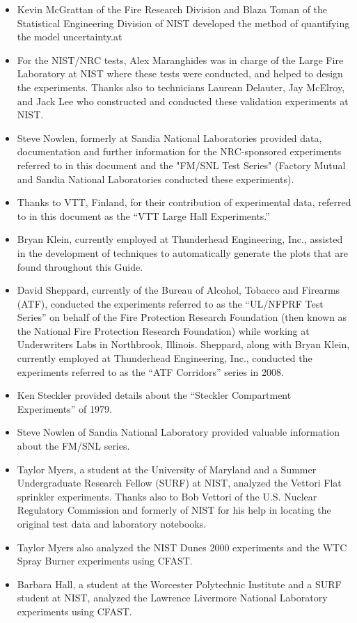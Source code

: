 \documentclass[12pt]{book}
\begin{document}
\begin{itemize}
\item Kevin McGrattan of the Fire Research Division and Blaza Toman of the Statistical Engineering Division of NIST developed the method of quantifying the model uncertainty.at
\item For the NIST/NRC tests, Alex Maranghides was in charge of the Large Fire Laboratory at NIST where these tests were conducted, and helped to design the experiments. Thanks also to technicians Laurean Delauter, Jay McElroy, and Jack Lee who constructed and conducted these validation experiments at NIST.

\item Steve Nowlen, formerly at Sandia National Laboratories provided data, documentation and further information for the NRC-sponsored experiments referred to in this document and the "FM/SNL Test Series" (Factory Mutual and Sandia National Laboratories conducted these experiments).

\item Thanks to VTT, Finland, for their contribution of experimental data, referred to in this document as the ``VTT Large Hall Experiments.''

\item Bryan Klein, currently employed at Thunderhead Engineering, Inc., assisted in the development of techniques to automatically generate the plots that are found throughout this Guide.

\item David Sheppard, currently of the Bureau of Alcohol, Tobacco and Firearms (ATF), conducted the experiments referred to as the ``UL/NFPRF Test Series'' on behalf of the Fire Protection Research Foundation (then known as the National Fire Protection Research Foundation) while working at Underwriters Labs in Northbrook, Illinois. Sheppard, along with Bryan Klein, currently employed at Thunderhead Engineering, Inc., conducted the experiments referred to as the ``ATF Corridors'' series in 2008.

\item Ken Steckler provided details about the ``Steckler Compartment Experiments'' of 1979.

\item Steve Nowlen of Sandia National Laboratory provided valuable information about the FM/SNL series.

\item Taylor Myers, a student at the University of Maryland and a Summer Undergraduate Research Fellow (SURF) at NIST, analyzed the Vettori Flat sprinkler experiments. Thanks also to Bob Vettori of the U.S. Nuclear Regulatory Commission and formerly of NIST for his help in locating the original test data and laboratory notebooks.

\item Taylor Myers also analyzed the NIST Dunes 2000 experiments and the WTC Spray Burner experiments using CFAST.

\item Barbara Hall, a student at the Worcester Polytechnic Institute and a SURF student at NIST, analyzed the Lawrence Livermore National Laboratory experiments using CFAST.

\end{itemize}
\end{document}
